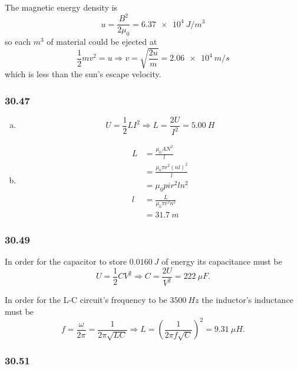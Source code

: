 \documentclass{article}
\begin{document}
The magnetic energy density is \[u = \frac{B^2}{2 \mu_0} = \qty{6.37e4}{J/m^3}\] so each $\unit{m^3}$ of material could be ejected at \[\frac{1}{2} m v^2 = u \Rightarrow v = \sqrt{\frac{2 u}{m}} = \qty{2.06e4}{m/s}\] which is less than the sun's escape velocity.

\subsubsection{30.47}

\begin{enumerate}[(a)]
  \item \[U = \frac{1}{2} L I^2 \Rightarrow L = \frac{2 U}{I^2} = \qty{5.00}{H}\]

  \item

        \begin{align*}
          L & = \frac{\mu_0 A N^2}{l}          \\
            & = \frac{\mu_0 \pi r^2 (nl)^2}{l} \\
            & = \mu_0 pi r^2 l n^2             \\
          l & = \frac{L}{\mu_0 \pi r^2 n^2}    \\
            & = \qty{31.7}{m}
        \end{align*}
\end{enumerate}

\subsubsection{30.49}

In order for the capacitor to store $\qty{0.0160}{J}$ of energy its capacitance must be \[U = \frac{1}{2} C V^2 \Rightarrow C = \frac{2 U}{V^2} = \qty{222}{\mu F}.\]

In order for the L-C circuit's frequency to be $\qty{3500}{Hz}$ the inductor's inductance must be \[f = \frac{\omega}{2 \pi} = \frac{1}{2 \pi \sqrt{L C}} \Rightarrow L = \left( \frac{1}{2 \pi f \sqrt{C}} \right)^2 = \qty{9.31}{\mu H}.\]

\subsubsection{30.51}
\end{document}
